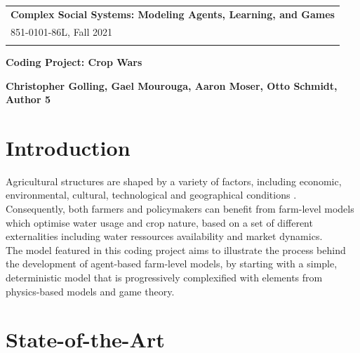 \documentclass[a4paper,12pt]{article} %
\begin{document}
\thispagestyle{empty}
\begin{tabular}{p{15.5cm}}
{\bf Complex Social Systems: Modeling Agents, Learning, and Games} \\
851-0101-86L, Fall 2021  \\
\hline \\
\end{tabular}
\vspace*{0.3cm}
\begin{center}
	{\Large \bf Coding Project: Crop Wars}
	\vspace{2mm}
        
	{\bf Christopher Golling, Gael Mourouga, Aaron Moser, Otto Schmidt, Author 5 }
		
\end{center}  

\vspace{0.4cm}

\section{Introduction}

Agricultural structures are shaped by a variety of factors, including economic, environmental, cultural, technological and geographical conditions \cite{happeAgriculturalPoliciesFarm2004}. \\
Consequently, both farmers and policymakers can benefit from farm-level models which optimise water usage and crop nature, based on a set of different externalities including water ressources availability and market dynamics.\\
The model featured in this coding project aims to illustrate the process behind the development of agent-based farm-level models, by starting with a simple, deterministic model that is progressively complexified with elements from physics-based models and game theory.


\section{State-of-the-Art}
\end{document}
